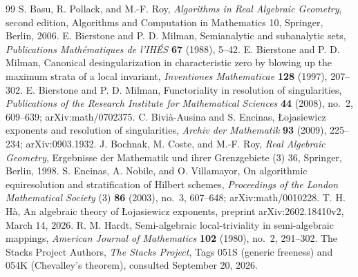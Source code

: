 \begin{thebibliography}{99}
 S. Basu, R. Pollack, and M.-F. Roy,
\emph{Algorithms in Real Algebraic Geometry}, second edition,
Algorithms and Computation in Mathematics 10, Springer, Berlin, 2006.
 E. Bierstone and P. D. Milman,
Semianalytic and subanalytic sets,
\emph{Publications Math\'ematiques de l'IH\'ES} \textbf{67} (1988), 5--42.
 E. Bierstone and P. D. Milman,
Canonical desingularization in characteristic zero by blowing up the
maximum strata of a local invariant,
\emph{Inventiones Mathematicae} \textbf{128} (1997), 207--302.
 E. Bierstone and P. D. Milman,
Functoriality in resolution of singularities,
\emph{Publications of the Research Institute for Mathematical Sciences}
\textbf{44} (2008), no.~2, 609--639; arXiv:math/0702375.
 C. Bivi\`a-Ausina and S. Encinas,
\L{}ojasiewicz exponents and resolution of singularities,
\emph{Archiv der Mathematik} \textbf{93} (2009), 225--234;
arXiv:0903.1932.
 J. Bochnak, M. Coste, and M.-F. Roy,
\emph{Real Algebraic Geometry}, Ergebnisse der Mathematik und ihrer
Grenzgebiete (3) 36, Springer, Berlin, 1998.
 S. Encinas, A. Nobile, and O. Villamayor,
On algorithmic equiresolution and stratification of Hilbert schemes,
\emph{Proceedings of the London Mathematical Society} (3)
\textbf{86} (2003), no.~3, 607--648; arXiv:math/0010228.
 T. H. H\`a,
An algebraic theory of \L{}ojasiewicz exponents,
preprint arXiv:2602.18410v2, March 14, 2026.
 R. M. Hardt,
Semi-algebraic local-triviality in semi-algebraic mappings,
\emph{American Journal of Mathematics} \textbf{102} (1980), no.~2, 291--302.
 The Stacks Project Authors,
\emph{The Stacks Project}, Tags 051S (generic freeness) and
054K (Chevalley's theorem), consulted September 20, 2026.
\end{thebibliography}

